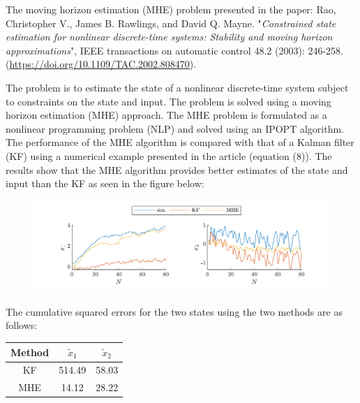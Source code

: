 
The moving horizon estimation (MHE) problem presented in the paper: Rao, Christopher V., James B. Rawlings, and David Q. Mayne. "\emph{Constrained state estimation for nonlinear discrete-time systems: Stability and moving horizon approximations}", IEEE transactions on automatic control 48.2 (2003): 246-258. (\url{https://doi.org/10.1109/TAC.2002.808470}). 

The problem is to estimate the state of a nonlinear discrete-time system subject to constraints on the state and input. The problem is solved using a moving horizon estimation (MHE) approach. The MHE problem is formulated as a nonlinear programming problem (NLP) and solved using an IPOPT algorithm. The performance of the MHE algorithm is compared with that of a Kalman filter (KF) using a numerical example presented in the article (equation (8)). The results show that the MHE algorithm provides better estimates of the state and input than the KF as seen in the figure below: 
\begin{figure}[!h]
    \centering
    \includegraphics{figures/ex5_MHE.pdf}
\end{figure}

The cumulative squared errors for the two states using the two methods are as follows:
\begin{table}[!h]
    \centering
    \begin{tabular}{c|c|c}
        Method & $\tilde x_1$ & $\tilde x_2$ \\
        \hline 
        KF & 514.49 & 58.03 \\
        MHE & 14.12 & 28.22
    \end{tabular}
\end{table}


